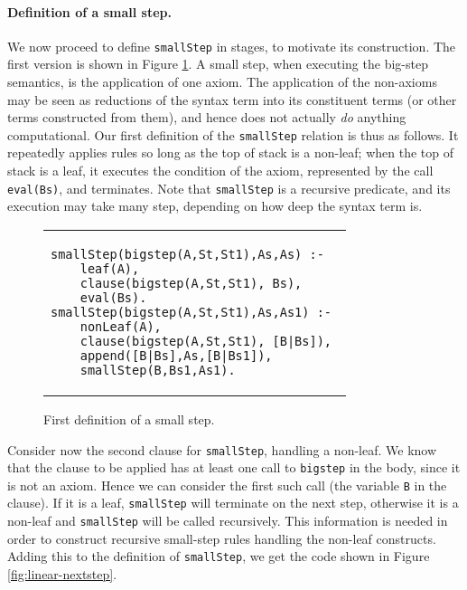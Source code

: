 \documentclass{llncs}
\begin{document}
\paragraph{Definition of a small step.} We now proceed to define \texttt{smallStep} in stages, to motivate its construction.
The first version is shown in Figure \ref{fig:linear-smallstep}.
A small step, when executing the big-step semantics, is the application of one axiom.  
The application of the non-axioms may be seen as reductions of the syntax
term into its constituent terms (or other terms constructed from them), and hence does not actually \emph{do} anything computational.
Our first definition of the \texttt{smallStep} relation is thus as follows. It repeatedly applies rules so long as the top of stack is a non-leaf; when 
the top of stack is a leaf, it executes the condition of the axiom, represented by the call \texttt{eval(Bs)}, and terminates.  
Note that \texttt{smallStep}
is a recursive predicate, and its execution may take many step, depending on how deep the syntax term is.

\begin{figure}
\begin{tabular}{l}
\begin{lstlisting}
smallStep(bigstep(A,St,St1),As,As) :- 
    leaf(A),
    clause(bigstep(A,St,St1), Bs),
    eval(Bs).
smallStep(bigstep(A,St,St1),As,As1) :- 
    nonLeaf(A),
    clause(bigstep(A,St,St1), [B|Bs]),
    append([B|Bs],As,[B|Bs1]),
    smallStep(B,Bs1,As1).
\end{lstlisting}
\end{tabular}
\caption{First definition of a small step.}\label{fig:linear-smallstep}
\end{figure}

Consider now the second clause for \texttt{smallStep}, handling a non-leaf.  We know that the clause to be applied has at least one
call to \texttt{bigstep} in the body, since it is not an axiom. Hence we can consider the first such call (the variable \texttt{B} in the clause).
If it is a leaf, \texttt{smallStep} will terminate on the next step, otherwise it is a non-leaf and \texttt{smallStep} will be called recursively.
This information is needed in order to construct recursive small-step rules handling the non-leaf constructs. Adding this to the definition of
\texttt{smallStep}, we get the code shown in Figure \ref{fig:linear-nextstep}.
\end{document}
